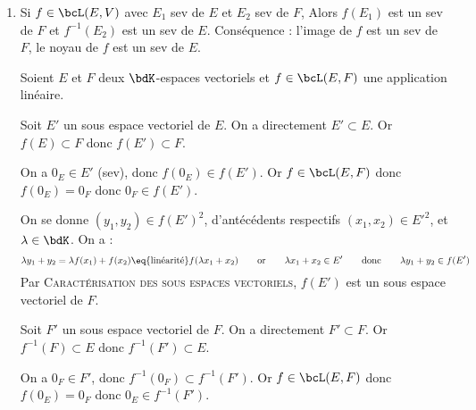 \documentclass[a4paper,french,bookmarks]{article}
\begin{document}
\begin{enumerate}
    \item Si $f \in \bcL(E, V)$ avec $E_1$ sev de $E$ et $E_2$ sev de $F$, Alors $f(E_1)$ est un sev de $F$ et $f^{-1}(E_2)$ est un sev de $E$. Conséquence : l'image de $f$ est un sev de $F$, le noyau de $f$ est un sev de $E$.
    
    \noafter
	\nobefore
	\begin{nproof}
        Soient $E$ et $F$ deux $\bdK$-espaces vectoriels et $f \in \bcL(E, F)$ une application linéaire.
        \begin{enumerate}
            \itt Soit $E'$ un sous espace vectoriel de $E$. On a directement $E' \subset E$. Or $f(E) \subset F$ donc $f(E') \subset F$.
            
            On a $0_E \in E'$ (sev), donc $f(0_E) \in f(E')$. Or $f \in \bcL(E, F)$ donc $f(0_E) = 0_F$ donc $0_F \in f(E')$.
            
            On se donne $(y_1, y_2) \in f(E')^2$, d'antécédents respectifs $(x_1, x_2) \in E'^2$, et $\lambda \in \bdK$. On a :
            \[ \lambda y_1 + y_2 = \lambda f(x_1) + f(x_2) \eq{\text{linéarité}} f(\lambda x_1 + x_2) \qquad\text{or}\qquad \lambda x_1 + x_2 \in E' \qquad\text{donc}\qquad \lambda y_1 + y_2 \in f(E')\]
            Par \textsc{Caractérisation des sous espaces vectoriels}, $f(E')$ est un sous espace vectoriel de $F$.
            
            \itt Soit $F'$ un sous espace vectoriel de $F$. On a directement $F' \subset F$. Or $f^{-1}(F) \subset E$ donc $f^{-1}(F') \subset E$.
            
            On a $0_F \in F'$, donc $f^{-1}(0_F) \subset f^{-1}(F')$. Or $f \in \bcL(E, F)$ donc $f(0_E) = 0_F$ donc $0_E \in f^{-1}(F')$.
            

\end{enumerate}
\end{nproof}
\end{enumerate}
\end{document}
